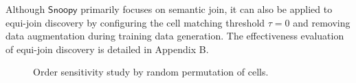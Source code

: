 Although $\textsf{Snoopy}$ primarily focuses on semantic join, 
it can also be applied to equi-join discovery by configuring the cell matching threshold $\tau = 0$ and removing data augmentation during training data generation. The effectiveness evaluation of equi-join discovery is detailed in Appendix B. 


\begin{figure}
\centering

\vspace{-4mm}
\caption{ Order sensitivity study by random permutation of cells. }
\label{fig:impact of order}
\vspace{-2mm}
\end{figure}









